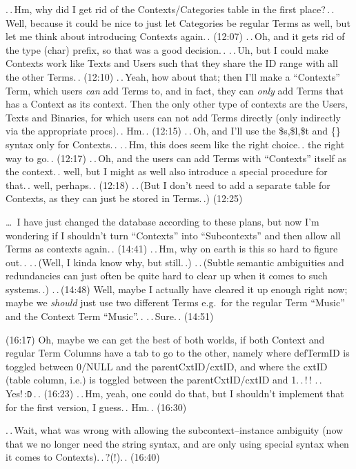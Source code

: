 \documentclass{report}
\begin{document}
.\,.\,Hm, why did I get rid of the Contexts/Categories table in the first place?\,.\,. Well, because it could be nice to just let Categories be regular Terms as well, but let me think about introducing Contexts again.\,. (12:07) .\,.\,Oh, and it gets rid of the type (char) prefix, so that was a good decision.\,. .\,.\,Uh, but I could make Contexts work like Texts and Users such that they share the ID range with all the other Terms.\,. (12:10) .\,.\,Yeah, how about that; then I'll make a ``Contexts'' Term, which users \emph{can} add Terms to, and in fact, they can \emph{only} add Terms that has a Context as its context. Then the only other type of contexts are the Users, Texts and Binaries, for which users can not add Terms directly (only indirectly via the appropriate procs).\,. Hm.\,. (12:15) .\,.\,Oh, and I'll use the \$s,\$l,\$t and \{\} syntax only for Contexts.\,. .\,.\,Hm, this does seem like the right choice.\,. the right way to go.\,. (12:17) .\,.\,Oh, and the users can add Terms with ``Contexts'' itself as the context.\,. well, but I might as well also introduce a special procedure for that.\,. well, perhaps.\,. (12:18)
.\,.\,(But I don't need to add a separate table for Contexts, as they can just be stored in Terms.\,.) (12:25)

\ldots\ I have just changed the database according to these plans, but now I'm wondering if I shouldn't turn ``Contexts'' into ``Subcontexts'' and then allow all Terms as contexts again.\,. (14:41) .\,.\,Hm, why on earth is this so hard to figure out.\,. .\,.\,(Well, I kinda know why, but still.\,.) .\,.\,(Subtle semantic ambiguities and redundancies can just often be quite hard to clear up when it comes to such systems.\,.) .\,.\,(14:48) Well, maybe I actually have cleared it up enough right now; maybe we \emph{should} just use two different Terms e.g.\ for the regular Term ``Music'' and the Context Term ``Music''.\,. .\,.\,Sure.\,. (14:51)

(16:17) Oh, maybe we can get the best of both worlds, if both Context and regular Term Columns have a tab to go to the other, namely where defTermID is toggled between 0/NULL and the parentCxtID/cxtID, and where the cxtID (table column, i.e.) is toggled between the parentCxtID/cxtID and 1.\,.\,!\,! .\,.\,Yes!\,:\texttt{D}\,.\,. (16:23)
.\,.\,Hm, yeah, one could do that, but I shouldn't implement that for the first version, I guess.\,. Hm.\,. (16:30)

.\,.\,Wait, what was wrong with allowing the subcontext--instance ambiguity (now that we no longer need the string syntax, and are only using special syntax when it comes to Contexts).\,.\,?(!).\,. (16:40)
\end{document}
